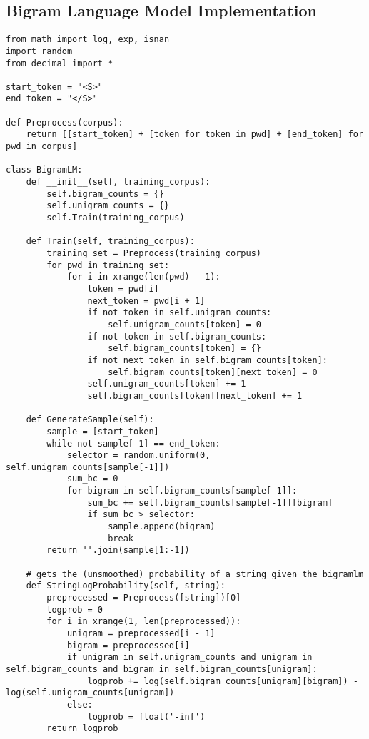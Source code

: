 \documentclass{amsart}
\theoremstyle{definition}
\theoremstyle{remark}
\numberwithin{equation}{section}
\begin{document}
\subsection{Bigram Language Model Implementation}
\begin{lstlisting}
from math import log, exp, isnan
import random
from decimal import *

start_token = "<S>"
end_token = "</S>"

def Preprocess(corpus):
    return [[start_token] + [token for token in pwd] + [end_token] for pwd in corpus]

class BigramLM:
    def __init__(self, training_corpus):
        self.bigram_counts = {}
        self.unigram_counts = {}
        self.Train(training_corpus)

    def Train(self, training_corpus):
        training_set = Preprocess(training_corpus)
        for pwd in training_set:
            for i in xrange(len(pwd) - 1):
                token = pwd[i]
                next_token = pwd[i + 1]
                if not token in self.unigram_counts:
                    self.unigram_counts[token] = 0
                if not token in self.bigram_counts:
                    self.bigram_counts[token] = {}
                if not next_token in self.bigram_counts[token]:
                    self.bigram_counts[token][next_token] = 0
                self.unigram_counts[token] += 1
                self.bigram_counts[token][next_token] += 1

    def GenerateSample(self):
        sample = [start_token]
        while not sample[-1] == end_token:
            selector = random.uniform(0, self.unigram_counts[sample[-1]])
            sum_bc = 0
            for bigram in self.bigram_counts[sample[-1]]:
                sum_bc += self.bigram_counts[sample[-1]][bigram]
                if sum_bc > selector:
                    sample.append(bigram)
                    break
        return ''.join(sample[1:-1])

    # gets the (unsmoothed) probability of a string given the bigramlm
    def StringLogProbability(self, string):
        preprocessed = Preprocess([string])[0]
        logprob = 0
        for i in xrange(1, len(preprocessed)):
            unigram = preprocessed[i - 1]
            bigram = preprocessed[i]
            if unigram in self.unigram_counts and unigram in self.bigram_counts and bigram in self.bigram_counts[unigram]:
                logprob += log(self.bigram_counts[unigram][bigram]) - log(self.unigram_counts[unigram])
            else:
                logprob = float('-inf')
        return logprob


\end{lstlisting}
\end{document}
